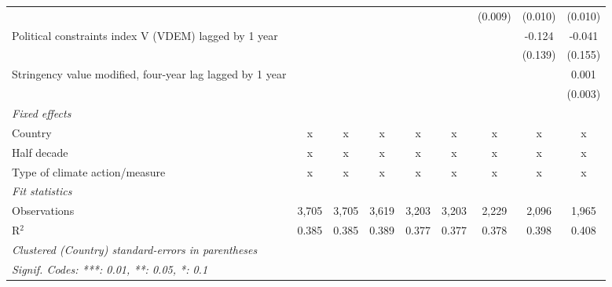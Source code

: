 \begin{tabular}{lcccccccc}
                                                             &             &             &             &               &               & (0.009)      & (0.010)      & (0.010)\\   
   Political constraints index V (VDEM) lagged by 1 year     &             &             &             &               &               &              & -0.124       & -0.041\\   
                                                             &             &             &             &               &               &              & (0.139)      & (0.155)\\   
   Stringency value modified, four-year lag lagged by 1 year &             &             &             &               &               &              &              & 0.001\\   
                                                             &             &             &             &               &               &              &              & (0.003)\\   
   \emph{Fixed effects}\\
   Country                                                   & x           & x           & x           & x             & x             & x            & x            & x\\  
   Half decade                                               & x           & x           & x           & x             & x             & x            & x            & x\\  
   Type of climate action/measure                            & x           & x           & x           & x             & x             & x            & x            & x\\  
   \midrule \emph{Fit statistics}\\
   Observations                                              & 3,705       & 3,705       & 3,619       & 3,203         & 3,203         & 2,229        & 2,096        & 1,965\\  
   R$^2$                                                     & 0.385       & 0.385       & 0.389       & 0.377         & 0.377         & 0.378        & 0.398        & 0.408\\  
   \midrule
   \multicolumn{9}{l}{\emph{Clustered (Country) standard-errors in parentheses}}\\
   \multicolumn{9}{l}{\emph{Signif. Codes: ***: 0.01, **: 0.05, *: 0.1}}\\
\end{tabular}
\par\endgroup


